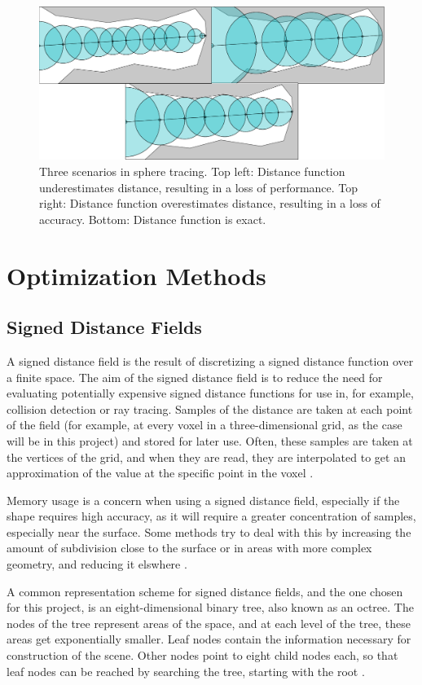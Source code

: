 \begin{figure} [ht]
	\centering
	\includegraphics[width=0.65\linewidth, frame]{Images/Sphere-Tracing.png}
	\caption{Three scenarios in sphere tracing. Top left: Distance function underestimates distance, resulting in a loss of performance. Top right: Distance function overestimates distance, resulting in a loss of accuracy. Bottom: Distance function is exact.}
	\label{figure:sphere-tracing}
\end{figure}

\section{Optimization Methods}

\subsection{Signed Distance Fields}

A signed distance field is the result of discretizing a signed distance function over a finite space. The aim of the signed distance field is to reduce the need for evaluating potentially expensive signed distance functions for use in, for example, collision detection or ray tracing. Samples of the distance are taken at each point of the field (for example, at every voxel in a three-dimensional grid, as the case will be in this project) and stored for later use. Often, these samples are taken at the vertices of the grid, and when they are read, they are interpolated to get an approximation of the value at the specific point in the voxel \cite{koschier2016hierarchical}.\newline

Memory usage is a concern when using a signed distance field, especially if the shape requires high accuracy, as it will require a greater concentration of samples, especially near the surface. Some methods try to deal with this by increasing the amount of subdivision close to the surface or in areas with more complex geometry, and reducing it elswhere \cite{frisken2000adaptively}.

A common representation scheme for signed distance fields, and the one chosen for this project, is an eight-dimensional binary tree, also known as an octree. The nodes of the tree represent areas of the space, and at each level of the tree, these areas get exponentially smaller. Leaf nodes contain the information necessary for construction of the scene. Other nodes point to eight child nodes each, so that leaf nodes can be reached by searching the tree, starting with the root \cite{meagher1982geometric}.\newline

